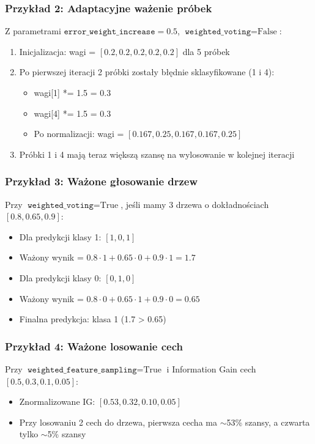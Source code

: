 \documentclass[11pt,a4paper]{article}
\begin{document}
\subsubsection{Przykład 2: Adaptacyjne ważenie próbek}
Z parametrami $\texttt{error\_weight\_increase} = 0.5$, $\texttt{weighted\_voting} = \text{False}$:

\begin{enumerate}
    \item Inicjalizacja: wagi = $[0.2, 0.2, 0.2, 0.2, 0.2]$ dla 5 próbek
    \item Po pierwszej iteracji 2 próbki zostały błędnie sklasyfikowane (1 i 4):
    \begin{itemize}
        \item wagi[1] *= 1.5 = 0.3
        \item wagi[4] *= 1.5 = 0.3
        \item Po normalizacji: wagi = $[0.167, 0.25, 0.167, 0.167, 0.25]$
    \end{itemize}
    \item Próbki 1 i 4 mają teraz większą szansę na wylosowanie w kolejnej iteracji
\end{enumerate}

\subsubsection{Przykład 3: Ważone głosowanie drzew}
Przy $\texttt{weighted\_voting} = \text{True}$, jeśli mamy 3 drzewa o dokładnościach $[0.8, 0.65, 0.9]$:
\begin{itemize}
    \item Dla predykcji klasy 1: $[1, 0, 1]$
    \item Ważony wynik = $0.8 \cdot 1 + 0.65 \cdot 0 + 0.9 \cdot 1 = 1.7$
    \item Dla predykcji klasy 0: $[0, 1, 0]$
    \item Ważony wynik = $0.8 \cdot 0 + 0.65 \cdot 1 + 0.9 \cdot 0 = 0.65$
    \item Finalna predykcja: klasa 1 (1.7 > 0.65)
\end{itemize}

\subsubsection{Przykład 4: Ważone losowanie cech}
Przy $\texttt{weighted\_feature\_sampling} = \text{True}$ i Information Gain cech $[0.5, 0.3, 0.1, 0.05]$:
\begin{itemize}
    \item Znormalizowane IG: $[0.53, 0.32, 0.10, 0.05]$
    \item Przy losowaniu 2 cech do drzewa, pierwsza cecha ma $\sim$53\% szansy, a czwarta tylko $\sim$5\% szansy
\end{itemize}
\end{document}
